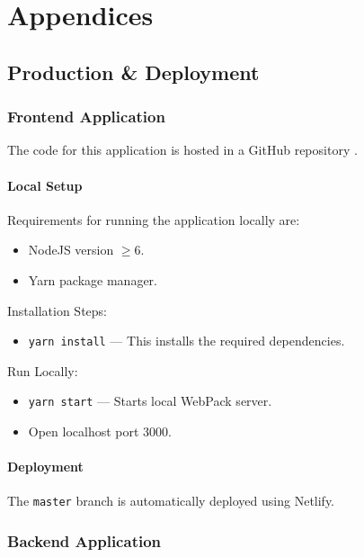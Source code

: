 \documentclass[a4paper,11pt]{article}
\def\code#1{\texttt{#1}}
\begin{document}
\section{Appendices}

\subsection{Production \& Deployment}

\subsubsection{Frontend Application}

The code for this application is hosted in a GitHub repository
\autocite{github:13}.

\paragraph{Local Setup}

Requirements for running the application locally are:

\begin{itemize}
  \item NodeJS version $\geq 6$.
  \item Yarn package manager.
\end{itemize}

\noindent{}
Installation Steps:

\begin{itemize}
  \item \code{yarn install} --- This installs the required dependencies.
\end{itemize}

\noindent{}
Run Locally:

\begin{itemize}
  \item \code{yarn start} --- Starts local WebPack server.
  \item Open localhost port 3000.
\end{itemize}

\paragraph{Deployment}

The \code{master} branch is automatically deployed using Netlify.

\subsubsection{Backend Application}
\end{document}
